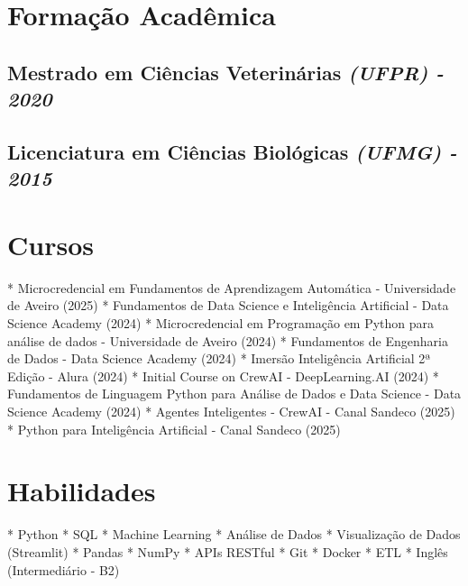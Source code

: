 \documentclass{article}
\begin{document}
\section*{Formação Acadêmica}
\subsection*{Mestrado em Ciências Veterinárias \textit{(UFPR) - 2020}}
\subsection*{Licenciatura em Ciências Biológicas \textit{(UFMG) - 2015}}

\section*{Cursos}
* Microcredencial em Fundamentos de Aprendizagem Automática - Universidade de Aveiro (2025)
* Fundamentos de Data Science e Inteligência Artificial - Data Science Academy (2024)
* Microcredencial em Programação em Python para análise de dados - Universidade de Aveiro (2024)
* Fundamentos de Engenharia de Dados - Data Science Academy (2024)
* Imersão Inteligência Artificial 2ª Edição - Alura (2024)
* Initial Course on CrewAI - DeepLearning.AI (2024)
* Fundamentos de Linguagem Python para Análise de Dados e Data Science - Data Science Academy (2024)
* Agentes Inteligentes - CrewAI - Canal Sandeco (2025)
* Python para Inteligência Artificial - Canal Sandeco (2025)

\section*{Habilidades}
* Python
* SQL
* Machine Learning
* Análise de Dados
* Visualização de Dados (Streamlit)
* Pandas
* NumPy
* APIs RESTful
* Git
* Docker
* ETL
* Inglês (Intermediário - B2)
\end{document}
